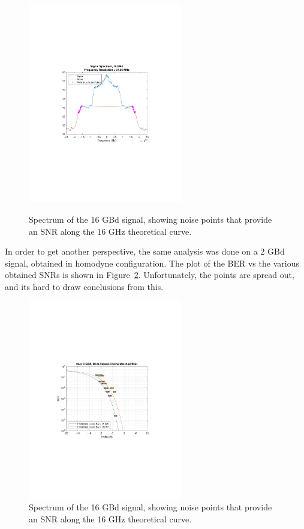 \begin{refsection}
\begin{figure}[H]
		\includegraphics[clip, trim=3cm 7cm 3cm 7cm, 
		width=0.6\textwidth]{./sdf/m_qam_system/figures/snr/snrVsBer/16GBdnear16GHz.pdf}
		\label{fig:snrAbsDev_16_2500}
	\caption{Spectrum of the 16 GBd signal, showing noise points that provide 
	an SNR along the 16 GHz theoretical curve.\label{fig:berVsSnr_16_tri30}}
\end{figure}

In order to get another perspective, the same analysis was done on a 2 GBd 
signal, obtained in homodyne configuration. The plot of the BER vs the various 
obtained SNRs is shown in Figure~\ref{fig:berVSvarSNR2GBD}. Unfortunately, the 
points are spread out, and its hard to draw conclusions from this.

\begin{figure}[H]
	\centering
	
	\includegraphics[clip, trim=3cm 7cm 3cm 7cm, 
	width=0.6\textwidth]{./sdf/m_qam_system/figures/snr/snrVsBer/2GBdAllSnrVsBERH.pdf}
	\caption{Spectrum of the 16 GBd signal, showing noise points that provide 
		an SNR along the 16 GHz theoretical curve.\label{fig:berVSvarSNR2GBD}}
\end{figure}




\end{refsection}

